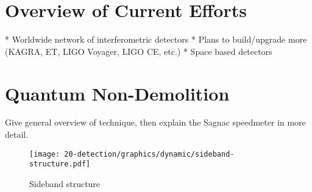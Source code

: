 \section{Overview of Current Efforts}
* Worldwide network of interferometric detectors
* Plans to build/upgrade more (KAGRA, ET, LIGO Voyager, LIGO CE, etc.)
* Space based detectors

\section{Quantum Non-Demolition}
Give general overview of technique, then explain the Sagnac speedmeter in more detail.

\begin{figure}
  \begin{center}
    \texttt{[image: 20-detection/graphics/dynamic/sideband-structure.pdf]}
    \caption{Sideband structure}
    \label{fig:sideband-structure}
  \end{center}
\end{figure}
